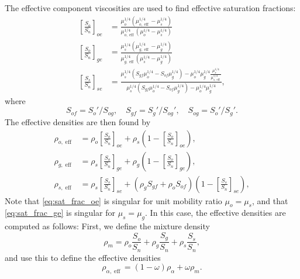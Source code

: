\documentclass[11pt, a4paper]{article}
\DeclareMathOperator{\eff}{eff}
\begin{document}
The effective component viscosities are used to find effective saturation fractions:
\begin{subequations}
  \begin{align}
    \label{eq:sat_frac_oe}
    \left[\frac{S_o}{S_n}\right]_{oe} &= \frac{\mu_o^{1/4}\left(\mu_{o,\eff}^{1/4} - \mu_s^{1/4}\right)}{\mu_{o,\eff}^{1/4}\left(\mu_o^{1/4} - \mu_s^{1/4}\right)} \\
    \label{eq:sat_frac_ge}
  \left[\frac{S_o}{S_n}\right]_{ge} &= \frac{\mu_s^{1/4}\left(\mu_{g,\eff}^{1/4} - \mu_g^{1/4}\right)}{\mu_{g,\eff}^{1/4}\left(\mu_s^{1/4} - \mu_g^{1/4}\right)} \\
  \left[\frac{S_s}{S_n}\right]_{se} &= \frac{\mu_s^{1/4}\left(S_{gf}\mu_o^{1/4} - S_{of}\mu_g^{1/4}\right)
                                      - \mu_o^{1/4}\mu_g^{1/4}\frac{\mu_s^{1/4}}{\mu_{s,\eff}^{1/4}}}{\mu_s^{1/4}\left(S_{gf}\mu_o^{1/4} - S_{of}\mu_g^{1/4}\right) - \mu_o^{1/4}\mu_g^{1/4}},
\end{align}
\end{subequations}
where
\begin{equation*}
  S_{of} = S_o'/S_{og}, \quad S_{gf} = S_g'/S_{og}', \quad S_{og} = S_o'/S_g'.
\end{equation*}
The effective densities are then found by
\begin{align*}
  \rho_{o,\eff} & = \rho_o\left[\frac{S_o}{S_n}\right]_{oe} + \rho_s\left(1 - \left[\frac{S_o}{S_n}\right]_{oe}\right), \\
  \rho_{g,\eff} & = \rho_s\left[\frac{S_o}{S_n}\right]_{ge} + \rho_g\left(1 - \left[\frac{S_o}{S_n}\right]_{ge}\right), \\
  \rho_{s,\eff} & = \rho_s\left[\frac{S_s}{S_n}\right]_{se} + (\rho_gS_{gf} + \rho_oS_{of})\left(1 - \left[\frac{S_s}{S_n}\right]_{se}\right),
\end{align*}
Note that \eqref{eq:sat_frac_oe} is singular for unit mobility ratio $\mu_o = \mu_s$, and that
\eqref{eq:sat_frac_ge} is singular for $\mu_s = \mu_g$. In this case, the effective densities are
computed as follows: First, we define the mixture density
\begin{equation*}
  \rho_m = \rho_o \frac{S_o}{S_n} + \rho_g \frac{S_g}{S_n} + \rho_s \frac{S_s}{S_n},
\end{equation*}
and use this to define the effective densities
\begin{equation*}
  \rho_{\alpha,\eff} = (1-\omega) \rho_\alpha + \omega \rho_m.
\end{equation*}
\end{document}
